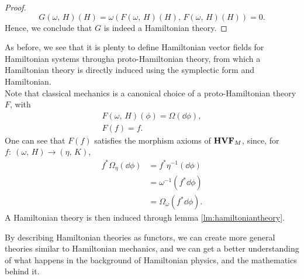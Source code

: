 \documentclass{article}
\newcommand{\category}[1]{{\normalfont\textbf{#1}}}
\begin{document}
\begin{multicols}{2}
\begin{proof}
\begin{equation*}
			G(\omega,\,H)(H) = \omega(F(\omega,\, H)(H),\, F(\omega,\, H)(H)) = 0.
		\end{equation*}
		Hence, we conclude that \(G\) is indeed a Hamiltonian theory.
	\end{proof}
	As before, we see that it is plenty to define Hamiltonian vector fields for Hamiltonian systems througha proto-Hamiltonian theory, from which a Hamiltonian theory is directly induced using the symplectic form and Hamiltonian.\\
	Note that classical mechanics is a canonical choice of a proto-Hamiltonian theory \(F\), with
	\begin{align}
		F(\omega,\,H)(\phi) = \Omega(\dd{\phi}),\\
		F(f) = f.
	\end{align}
	One can see that \(F(f)\) satisfies the morphism axioms of \(\category{HVF}_M\), since, for \(f:\ (\omega,\,H)\to(\eta,\,K)\),
	\begin{align*}
		f^*\Omega_\eta(\dd{\phi}) &= f^*\eta^{-1}(\dd{\phi})\\
		&= \omega^{-1}(f^*\dd{\phi})\\
		&= \Omega_\omega(f^*\dd{\phi}).
	\end{align*}
	A Hamiltonian theory is then induced through lemma \ref{lm:hamiltoniantheory}.
	\medskip\par
	By describing Hamiltonian theories as functors, we can create more general theories similar to Hamiltonian mechanics, and we can get a better understanding of what happens in the background of Hamiltonian physics, and the mathematics behind it.
\end{multicols}
\printbibliography
\end{document}
